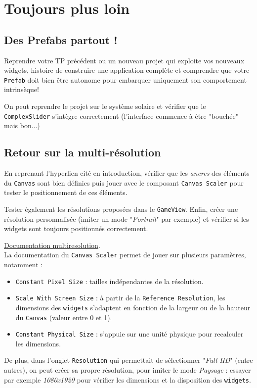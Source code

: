 \documentclass[a4paper,10pt]{article}
\newenvironment{solution}%
{\begin{tcolorbox}[breakable,colback=red!5!white,colframe=red!75!black,title=Solution]}%
{\end{tcolorbox}}
\begin{document}
\section{Toujours plus loin}

\subsection{Des Prefabs partout !}
Reprendre votre TP précédent ou un nouveau projet qui exploite vos nouveaux widgets, histoire de construire une application complète et comprendre que votre \texttt{Prefab} doit bien être autonome pour embarquer uniquement son comportement intrinsèque!

\ifversionenseignant
\begin{solution}
On peut reprendre le projet sur le système solaire et vérifier que le \texttt{ComplexSlider} s'intègre correctement (l'interface commence à être "bouchée" mais bon...)	
\end{solution}
\fi 

\subsection{Retour sur la multi-résolution}
En reprenant l'hyperlien cité en introduction, vérifier que les \textit{ancres} des éléments du \texttt{Canvas} sont bien définies puis jouer avec le composant \texttt{Canvas Scaler} pour tester le positionnement de ces éléments. 

Tester également les résolutions proposées dans le \texttt{GameView}. Enfin, créer une résolution personnalisée (imiter un mode "\textit{Portrait}" par exemple) et vérifier si les widgets sont toujours positionnés correctement.

\ifversionenseignant
\begin{solution}
	\href{ https://docs.unity3d.com/Packages/com.unity.ugui@2.5/manual/HOWTO-UIMultiResolution.html}{Documentation multiresolution}. \\
	
La documentation du \texttt{Canvas Scaler} permet de jouer sur plusieurs paramètres, notamment :
\begin{itemize}
	\item \texttt{Constant Pixel Size} : tailles indépendantes de la résolution.
	\item \texttt{Scale With Screen Size} : à partir de la \texttt{Reference Resolution}, les dimensions des \texttt{widgets} s'adaptent en fonction de la largeur ou de la hauteur du \texttt{Canvas} (valeur entre 0 et 1).
	\item \texttt{Constant Physical Size} : s'appuie sur une unité physique pour recalculer les dimensions.
\end{itemize}

De plus, dans l'onglet \texttt{Resolution} qui permettait de sélectionner "\textit{Full HD}" (entre autres), on peut créer sa propre résolution, pour imiter le mode \textit{Paysage} : essayer par exemple \textit{1080x1920} pour vérifier les dimensions et la disposition des \texttt{widgets}.

\end{solution}
\fi 
\end{document}
